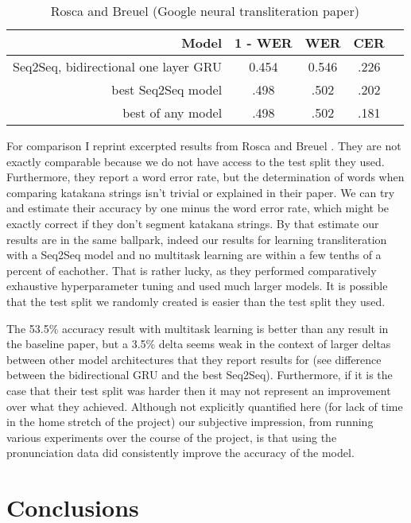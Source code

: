 \documentclass{article}
\begin{document}
\begin{table}[h]
  \centering
  \begin{tabular}{r | c c c c}
    Model & 1 - WER & WER & CER \\
    \hline
    Seq2Seq, bidirectional one layer GRU & 0.454 & 0.546 & .226 \\
    best Seq2Seq model & .498 & .502 & .202 \\
    best of any model & .498 & .502 & .181 \\
  \end{tabular}
  \caption{Rosca and Breuel \cite{Rosca2016SequencetosequenceNN} (Google neural
    transliteration paper)}
\end{table}

For comparison I reprint excerpted results
from Rosca and Breuel \cite{Rosca2016SequencetosequenceNN}.
They are not exactly comparable
because we do not have access to the test split they used.
Furthermore,
they report a word error rate,
but the determination of words when comparing katakana strings
isn't trivial or explained in their paper.
We can try and estimate their accuracy
by one minus the word error rate,
which might be exactly correct if they don't segment katakana strings.
By that estimate our results are in the same ballpark,
indeed our results for learning transliteration
with a Seq2Seq model and no multitask learning
are within a few tenths of a percent of eachother.
That is rather lucky,
as they performed comparatively exhaustive hyperparameter tuning
and used much larger models.
It is possible that the test split we randomly created
is easier than the test split they used.

The 53.5\% accuracy result with multitask learning
is better than any result in the baseline paper,
but a 3.5\% delta seems weak
in the context of larger deltas between other model architectures
that they report results for
(see difference between the bidirectional GRU and the best Seq2Seq).
Furthermore,
if it is the case that their test split was harder
then it may not represent an improvement over what they achieved.
Although not explicitly quantified here
(for lack of time in the home stretch of the project)
our subjective impression,
from running various experiments over the course of the project,
is that using the pronunciation data
did consistently improve the accuracy of the model.

\section*{Conclusions}
\end{document}
